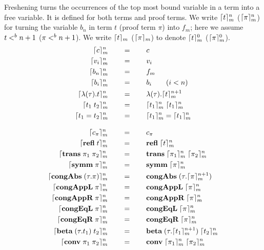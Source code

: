 \documentclass[10pt]{article}
\begin{document}
\begin{mydef}[Freshening]\label{def:stlcd-freshening}
Freshening turns the occurrences of the top most bound variable in a
term into a free variable. It is defined for both terms and proof
terms. We write $\lceil t\rceil^{n}_{m}$ ($\lceil\pi\rceil^{n}_{m}$) for
turning the variable $b_n$ in term $t$ (proof term $\pi$) into $f_m$;
here we assume $t <^{b} n+1$ ($\pi <^{b} n+1$). We write
$\lceil t\rceil_{m}$ ($\lceil\pi\rceil_{m}$) to denote $\lceil t\rceil^{0}_{m}$
($\lceil\pi\rceil^{0}_{m}$).
%
\\

\begin{align*}
  \lceil c\rceil^{n}_{m}   & \qquad = \qquad c\\
  \lceil v_i\rceil^{n}_{m} & \qquad = \qquad v_i\\
  \lceil b_n\rceil^{n}_{m} & \qquad = \qquad f_m\\
  \lceil b_i\rceil^{n}_{m} & \qquad = \qquad b_i  \qquad (i < n)\\
  \lceil\lambda{(\tau)}.{t}\rceil^{n}_{m} & \qquad = \qquad 
    \lambda{(\tau)}.{\lceil t\rceil^{n+1}_{m}}\\
  \lceil t_1\; t_2\rceil^{n}_{m} & \qquad = \qquad
    \lceil t_1\rceil^{n}_{m}\;  \lceil t_1\rceil^{n}_{m}\\
  \lceil t_1 = t_2\rceil^{n}_{m} & \qquad = \qquad
    \lceil t_1\rceil^{n}_{m} = \lceil t_1\rceil^{n}_{m}
\end{align*}


\begin{align*}
  \lceil c_\pi\rceil^{n}_{m}     & \qquad = \qquad c_\pi\\
  \lceil\mbox{\bf refl}\; t\rceil^{n}_{m} & \qquad = \qquad \mbox{\bf refl}\;\lceil t\rceil^{n}_{m}\\
  \lceil\mbox{\bf trans}\;\pi_1\; \pi_2\rceil^{n}_{m} & \qquad = \qquad 
    \mbox{\bf trans}\;\lceil\pi_1\rceil^{n}_{m}\; \lceil\pi_2\rceil^{n}_{m}\\
  \lceil\mbox{\bf symm}\; \pi\rceil^{n}_{m} & \qquad = \qquad 
    \mbox{\bf symm}\; \lceil\pi\rceil^{n}_{m}\\
  \lceil\mbox{\bf congAbs}\;(\tau.\pi)\rceil^{n}_{m} & \qquad = \qquad 
    \mbox{\bf congAbs}\;(\tau.\lceil\pi\rceil^{n+1}_{m})\\
  \lceil\mbox{\bf congAppL}\;\pi\rceil^{n}_{m} & \qquad = \qquad 
    \mbox{\bf congAppL}\;\lceil\pi\rceil^{n}_{m}\\
  \lceil\mbox{\bf congAppR}\;\pi\rceil^{n}_{m} & \qquad = \qquad 
    \mbox{\bf congAppR}\;\lceil\pi\rceil^{n}_{m}\\
  \lceil\mbox{\bf congEqL}\;\pi\rceil^{n}_{m} & \qquad = \qquad 
    \mbox{\bf congEqL}\;\lceil\pi\rceil^{n}_{m}\\
  \lceil\mbox{\bf congEqR}\;\pi\rceil^{n}_{m} & \qquad = \qquad 
    \mbox{\bf congEqR}\;\lceil\pi\rceil^{n}_{m}\\
  \lceil\mbox{\bf beta}\;(\tau.t_1)\; t_2\rceil^{n}_{m} & \qquad = \qquad 
    \mbox{\bf beta}\;(\tau.\lceil t_1\rceil^{n+1}_{m})\; \lceil t_2\rceil^{n}_{m}\\
  \lceil\mbox{\bf conv}\; \pi_1\; \pi_2\rceil^{n}_{m} & \qquad = \qquad
    \mbox{\bf conv}\; \lceil\pi_1\rceil^{n}_{m}\; \lceil\pi_2\rceil^{n}_{m}
\end{align*}
\end{mydef}
\end{document}
